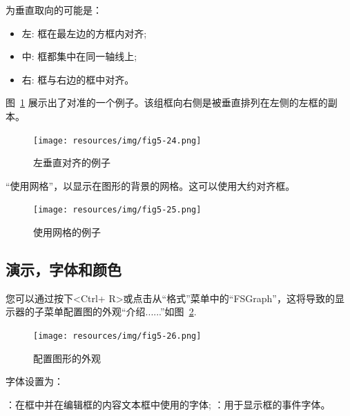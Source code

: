 \noindent 为垂直取向的可能是：
\begin{itemize}
  \item 左: 框在最左边的方框内对齐;
  \item 中: 框都集中在同一轴线上;
  \item 右: 框与右边的框中对齐。
\end{itemize}

\bigskip
\noindent 图~\ref{fig-vertical-left-alignment} 展示出了对准的一个例子。该组框向右侧是被垂直排列在左侧的左框的副本。

\bigskip
\begin{figure}[!h]
\begin{center}
\texttt{[image: resources/img/fig5-24.png]}
\caption{左垂直对齐的例子\label{fig-vertical-left-alignment}}
\end{center}
\end{figure}

\bigskip
{}“使用网格”，以显示在图形的背景的网格。这可以使用大约对齐框。

\bigskip
\begin{figure}[!h]
\begin{center}
\texttt{[image: resources/img/fig5-25.png]}
\caption{使用网格的例子}
\end{center}
\end{figure}

\subsection{演示，字体和颜色}
\label{section-display-fonts-colors}
您可以通过按下<Ctrl+ R>或点击从“格式”菜单中的“FSGraph”，这将导致的显示器的子菜单配置图的外观“介绍......”如图~\ref{fig-graph-display-configuration}.

\begin{figure}[!h]
\begin{center}
\texttt{[image: resources/img/fig5-26.png]}
\caption{配置图形的外观\label{fig-graph-display-configuration}}
\end{center}
\end{figure}

\bigskip
\noindent 字体设置为：
\begin{itemize}
  ：在框中并在编辑框的内容文本框中使用的字体;
：用于显示框的事件字体。
\end{itemize}

